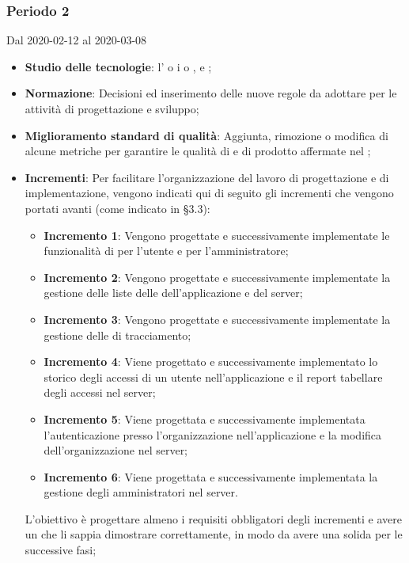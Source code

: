 \subsubsection{Periodo 2} 
Dal 2020-02-12 al 2020-03-08
\begin{itemize}
	\item \textbf{Studio delle tecnologie}: l'  o i   o ,  e ;
	\item \textbf{Normazione}: Decisioni ed inserimento delle nuove regole da adottare per le attività di progettazione e sviluppo;
	\item \textbf{Miglioramento standard di qualità}: Aggiunta, rimozione o modifica di alcune metriche per garantire le qualità di  e di prodotto affermate nel \PdQ{};
	\item \textbf{Incrementi}: Per facilitare l'organizzazione del lavoro di progettazione e di implementazione, vengono indicati qui di seguito gli incrementi che vengono portati avanti (come indicato in §3.3):
		\begin{itemize}
			\item \textbf{Incremento 1}: Vengono progettate e successivamente implementate le funzionalità di  per l'utente e per l'amministratore;
			\item \textbf{Incremento 2}: Vengono progettate e successivamente implementate la gestione delle liste delle  dell'applicazione e del server;
			\item \textbf{Incremento 3}: Vengono progettate e successivamente implementate la gestione delle  di tracciamento;
			\item \textbf{Incremento 4}: Viene progettato e successivamente implementato lo storico degli accessi di un utente nell'applicazione e il report tabellare degli accessi nel server;
			\item \textbf{Incremento 5}: Viene progettata e successivamente implementata l'autenticazione presso l'organizzazione nell'applicazione e la modifica dell'organizzazione nel server;
			\item \textbf{Incremento 6}: Viene progettata e successivamente implementata la gestione degli amministratori nel server.
		\end{itemize}
		L'obiettivo è progettare almeno i requisiti obbligatori degli incrementi e avere un  che li sappia dimostrare correttamente, in modo da avere una solida  per le successive fasi;

\end{itemize}
